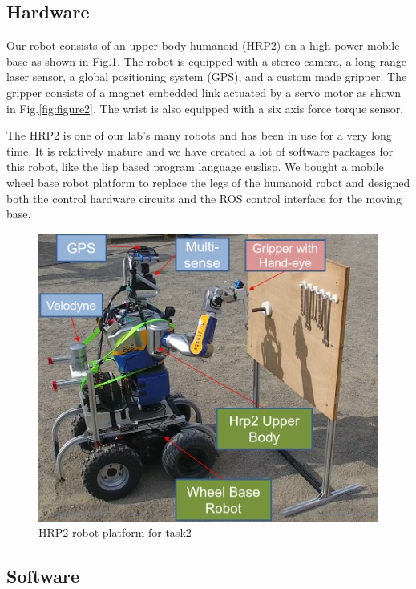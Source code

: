 \documentclass{standalone}
\begin{document}
\subsection{Hardware}
Our robot consists of an upper body humanoid (HRP2) on a high-power mobile base as shown in Fig.\ref{fig:figure1}. The robot is equipped with a stereo camera, a long range laser sensor, a global positioning system (GPS), and a custom made gripper. The gripper consists of a magnet embedded link actuated by a servo motor as shown in Fig.\ref{fig:figure2}. The wrist is also equipped with a six axis force torque sensor.

The HRP2 is one of our lab's many robots and has been in use for a very long time. It is relatively mature and we have created a lot of software packages for this robot, like the lisp based program language euslisp. %
We bought a mobile wheel base robot platform to replace the legs of the humanoid robot and designed both the control hardware circuits and the ROS control interface for the moving base.


\begin{figure}[t]
  \includegraphics[width=\columnwidth]{sections/task2/images/hrp2.png}
  \caption{HRP2 robot platform for task2}
  \label{fig:figure1}
\end{figure}

\subsection{Software}
\end{document}
